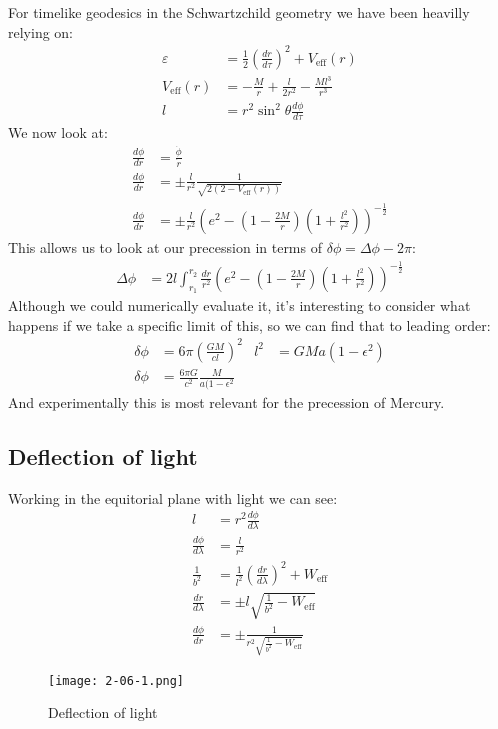 For timelike geodesics in the Schwartzchild geometry we have been heavilly relying on:
\begin{align*}
	\varepsilon &= \frac{1}{2}\left(\frac{dr}{d\tau}\right)^2 + V_\text{eff}(r) \\
	V_\text{eff}(r) &= -\frac{M}{r} + \frac{l}{2r^2} - \frac{Ml^3}{r^3} \\
	l &= r^2\sin^2\theta \frac{d\phi}{d\tau}
\end{align*}
We now look at:
\begin{align*}
	\frac{d\phi}{dr} &= \frac{\dot{\phi}}{\dot{r}} \\
	\frac{d\phi}{dr} &= \pm \frac{l}{r^2} \frac{1}{\sqrt{2(2-V_\text{eff}(r))}} \\
	\frac{d\phi}{dr} &= \pm \frac{l}{r^2} \left(e^2 - \left(1-\frac{2M}{r}\right)\left(1+ \frac{l^2}{r^2}\right)\right)^{-\frac{1}{2}}
\end{align*}
This allows us to look at our precession in terms of $\delta \phi = \Delta\phi -2\pi$:
\begin{align*}
	\Delta\phi &= 2l \int_{r_1}^{r_2} \frac{dr}{r^2}\left(e^2 - \left(1-\frac{2M}{r}\right)\left(1+ \frac{l^2}{r^2}\right)\right)^{-\frac{1}{2}}
\end{align*}
Although we could numerically evaluate it, it's interesting to consider what happens if we take a specific limit of this, so we can find that to leading order:
\begin{align*}
	\delta\phi &= 6\pi\left(\frac{GM}{cl}\right)^2 & l^2 &= GMa(1-\epsilon^2) \\
	\delta\phi &= \frac{6\pi G}{c^2} \frac{M}{a(1-\epsilon^2}
\end{align*}
And experimentally this is most relevant for the precession of Mercury.
\subsection{Deflection of light}
Working in the equitorial plane with light we can see:
\begin{align*}
	l&= r^2\frac{d\phi}{d\lambda} \\
	\frac{d\phi}{d\lambda} &= \frac{l}{r^2} \\
	\frac{1}{b^2} &= \frac{1}{l^2} \left(\frac{dr}{d\lambda}\right)^2 + W_\text{eff} \\
	\frac{dr}{d\lambda} &= \pm l \sqrt{\frac{1}{b^2} - W_\text{eff}} \\
	\frac{d\phi}{dr} &= \pm \frac{1}{r^2\sqrt{\frac{1}{b^2} - W_\text{eff}}}
\end{align*}
\begin{figure*}[h]
	\centering
	\texttt{[image: 2-06-1.png]}
	\caption*{Deflection of light}
\end{figure*}

